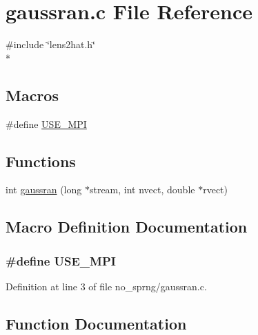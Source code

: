 \section{gaussran.\-c File Reference}
\label{no__sprng_2gaussran_8c}
{\ttfamily \#include \char`\"{}lens2hat.\-h\char`\"{}}\\*
\subsection*{Macros}
\begin{DoxyCompactItemize}
\item 
\#define \hyperlink{no__sprng_2gaussran_8c_a3869d282031f6ea6b50fdb980b758420}{U\-S\-E\-\_\-\-M\-P\-I}
\end{DoxyCompactItemize}
\subsection*{Functions}
\begin{DoxyCompactItemize}
\item 
int \hyperlink{no__sprng_2gaussran_8c_a39a2ff3b20f7a76c857538b7a20fe7bf}{gaussran} (long $\ast$stream, int nvect, double $\ast$rvect)
\end{DoxyCompactItemize}


\subsection{Macro Definition Documentation}
\subsubsection[{U\-S\-E\-\_\-\-M\-P\-I}]{\setlength{\rightskip}{0pt plus 5cm}\#define U\-S\-E\-\_\-\-M\-P\-I}\label{no__sprng_2gaussran_8c_a3869d282031f6ea6b50fdb980b758420}


Definition at line 3 of file no\-\_\-sprng/gaussran.\-c.



\subsection{Function Documentation}
